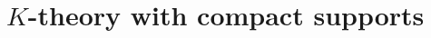 \documentclass[dvipdfmx]{jsarticle}
\begin{document}
\newpage
\section{\(K\)-theory with compact supports}

\end{document}

